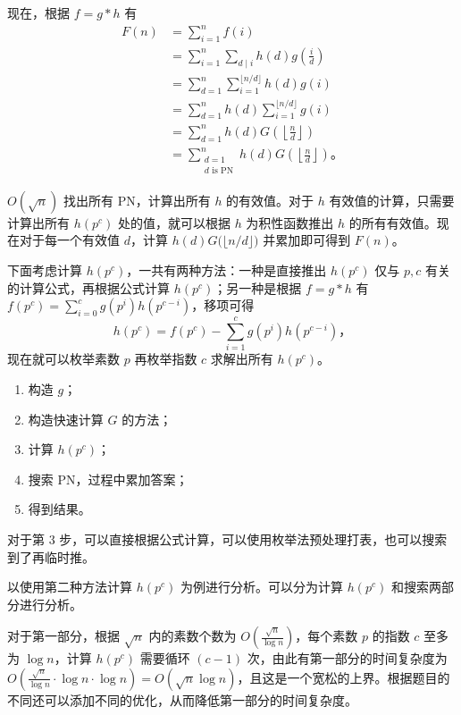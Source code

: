 现在，根据 $f = g * h$ 有
\[
\begin{aligned}
F(n) &= \sum_{i = 1}^{n} f(i) \\
     &= \sum_{i = 1}^{n} \sum_{d\mid i} h(d) g\!\left(\frac{i}{d}\right) \\
     &= \sum_{d=1}^{n} \sum_{i=1}^{\lfloor n/d \rfloor} h(d) g(i) \\
     &= \sum_{d=1}^{n} h(d) \sum_{i=1}^{\lfloor n/d \rfloor} g(i) \\
     &= \sum_{d=1}^{n} h(d) G\!\left(\left\lfloor \frac{n}{d} \right\rfloor\right) \\
     &= \sum_{\substack{d=1 \\ d \text{ is PN}}}^{n} h(d) G\!\left(\left\lfloor \frac{n}{d} \right\rfloor\right)。
\end{aligned}
\]

$O(\sqrt{n})$ 找出所有 PN，计算出所有 $h$ 的有效值。对于 $h$ 有效值的计算，只需要计算出所有 $h(p^c)$ 处的值，就可以根据 $h$ 为积性函数推出 $h$ 的所有有效值。现在对于每一个有效值 $d$，计算 $h(d) G\bigl(\lfloor n/d \rfloor\bigr)$ 并累加即可得到 $F(n)$。

下面考虑计算 $h(p^c)$，一共有两种方法：一种是直接推出 $h(p^c)$ 仅与 $p, c$ 有关的计算公式，再根据公式计算 $h(p^c)$；另一种是根据 $f = g * h$ 有 $f(p^c) = \sum_{i=0}^{c} g(p^i) h(p^{c-i})$，移项可得
\[
h(p^c) = f(p^c) - \sum_{i=1}^{c} g(p^i) h(p^{c-i})，
\]
现在就可以枚举素数 $p$ 再枚举指数 $c$ 求解出所有 $h(p^c)$。

\begin{enumerate}
    \item 构造 $g$；
    \item 构造快速计算 $G$ 的方法；
    \item 计算 $h(p^c)$；
    \item 搜索 PN，过程中累加答案；
    \item 得到结果。
\end{enumerate}
对于第 3 步，可以直接根据公式计算，可以使用枚举法预处理打表，也可以搜索到了再临时推。

以使用第二种方法计算 $h(p^c)$ 为例进行分析。可以分为计算 $h(p^c)$ 和搜索两部分进行分析。

对于第一部分，根据 $\sqrt{n}$ 内的素数个数为 $O\!\left(\frac{\sqrt{n}}{\log n}\right)$，每个素数 $p$ 的指数 $c$ 至多为 $\log n$，计算 $h(p^c)$ 需要循环 $(c-1)$ 次，由此有第一部分的时间复杂度为 $O\!\left(\frac{\sqrt{n}}{\log n} \cdot \log n \cdot \log n\right) = O(\sqrt{n}\log n)$，且这是一个宽松的上界。根据题目的不同还可以添加不同的优化，从而降低第一部分的时间复杂度。

